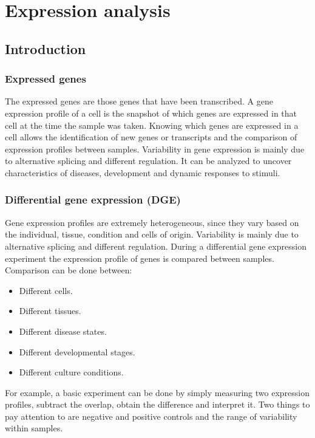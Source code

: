 \graphicspath{{chapters/05/images/}}
\chapter{Expression analysis}

\section{Introduction}

	\subsection{Expressed genes}
	The expressed genes are those genes that have been transcribed.
	A gene expression profile of a cell is the snapshot of which genes are expressed in that cell at the time the sample was taken.
	Knowing which genes are expressed in a cell allows the identification of new genes or transcripts and the comparison of expression profiles between samples.
	Variability in gene expression is mainly due to alternative splicing and different regulation.
	It can be analyzed to uncover characteristics of diseases, development and dynamic responses to stimuli.

	\subsection{Differential gene expression (DGE)}
	Gene expression profiles are extremely heterogeneous, since they vary based on the individual, tissue, condition and cells of origin.
	Variability is mainly due to alternative splicing and different regulation.
	During a differential gene expression experiment the expression profile of genes is compared between samples.
	Comparison can be done between:

	\begin{multicols}{2}
		\begin{itemize}
			\item Different cells.
			\item Different tissues.
			\item Different disease states.
			\item Different developmental stages.
			\item Different culture conditions.
		\end{itemize}
	\end{multicols}
	For example, a basic experiment can be done by simply measuring two expression profiles, subtract the overlap, obtain the difference and interpret it.
	Two things to pay attention to are negative and positive controls and the range of variability within samples.

